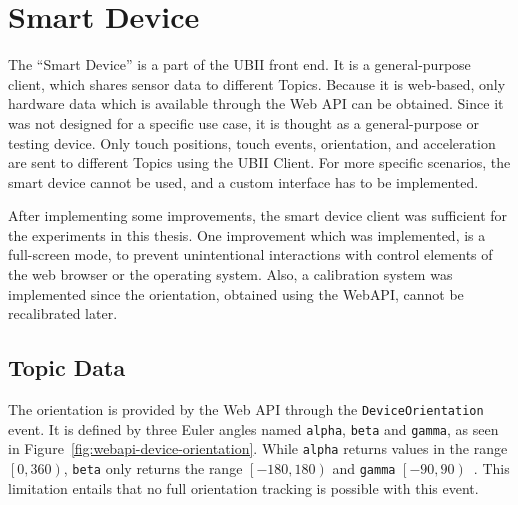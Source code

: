 \section{Smart Device}\label{section:smart-device}

The \enquote{Smart Device} is a part of the \gls{UBII} front end. It is a general-purpose client, which shares sensor data to different Topics. Because it is web-based, only hardware data which is available through the Web \gls{API} can be obtained. Since it was not designed for a specific use case, it is thought as a general-purpose or testing device. Only touch positions, touch events, orientation, and acceleration are sent to different Topics using the \gls{UBII} Client. For more specific scenarios, the smart device cannot be used, and a custom interface has to be implemented.

After implementing some improvements, the smart device client was sufficient for the experiments in this thesis. One improvement which was implemented, is a full-screen mode, to prevent unintentional interactions with control elements of the web browser or the operating system.
Also, a calibration system was implemented since the orientation, obtained using the Web\gls{API}, cannot be recalibrated later\cite{DevicesandSensorsWorkingGroup.2019}. 


\subsection{Topic Data}\label{subsection:topic-data}

The orientation is provided by the Web \gls{API} through the \lstinline{DeviceOrientation} event. It is defined by three Euler angles named \lstinline{alpha}, \lstinline{beta} and \lstinline{gamma}, as seen in Figure~\ref{fig:webapi-device-orientation}.
While \lstinline{alpha} returns values in the range \(\left[0, 360\right)\), \lstinline{beta} only returns the range \(\left[-180, 180\right)\) and \lstinline{gamma} \(\left[-90, 90\right)\)~\cite[Chapter~4.1]{DevicesandSensorsWorkingGroup.2019}. %
This limitation entails that no full orientation tracking is possible with this event.

